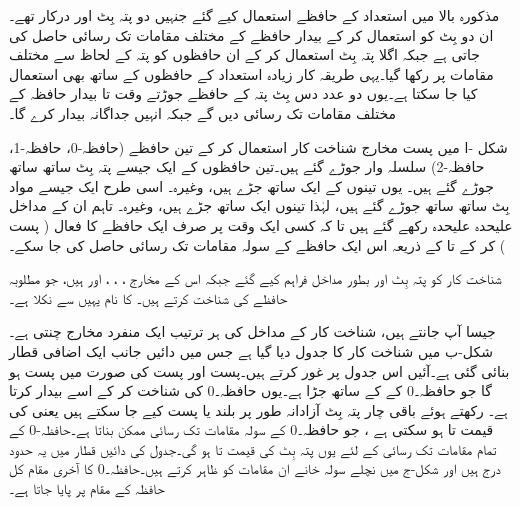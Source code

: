 مذکورہ بالا میں  استعداد کے حافظے استعمال کیے گئے جنہیں دو پتہ بِٹ  اور  درکار تھے۔ان دو بِٹ کو استعمال کر کے بیدار حافظے کے مختلف مقامات تک رسائی حاصل کی جاتی ہے جبکہ اگلا پتہ بِٹ  استعمال کر کے ان حافظوں کو پتہ کے لحاظ سے مختلف مقامات پر رکھا گیا۔یہی طریقہ کار زیادہ استعداد کے حافظوں کے ساتھ بھی استعمال کیا جا سکتا ہے۔یوں دو عدد دس بِٹ پتہ کے حافظے جوڑتے وقت  تا  بیدار حافظہ کے مختلف مقامات تک رسائی دیں گے جبکہ  انہیں جداگانہ بیدار کرے گا۔ 

شکل -ا میں پست مخارج شناخت کار استعمال کر کے تین  حافظے (حافظہ-0، حافظہ-1، حافظہ-2) سلسلہ وار جوڑے گئے ہیں۔تین حافظوں کے ایک جیسے پتہ بِٹ ساتھ ساتھ جوڑے گئے ہیں۔ یوں تینوں کے  ایک ساتھ جڑے ہیں، وغیرہ۔ اسی طرح ایک جیسے مواد بِٹ ساتھ ساتھ جوڑے گئے ہیں، لہٰذا تینوں  ایک ساتھ جڑے ہیں، وغیرہ۔ تاہم ان کے  مداخل علیحدہ علیحدہ رکھے گئے ہیں تا کہ کسی ایک وقت پر صرف ایک حافظے کا  فعال ( پست ) کر کے  تا  کے ذریعہ اس ایک حافظے کے سولہ مقامات تک رسائی حاصل کی جا سکے۔

 شناخت کار کو پتہ بِٹ  اور  بطور مداخل فراہم کیے گئے جبکہ اس کے مخارج ، ، ، اور  ہیں، جو مطلوبہ حافظے کی شناخت کرتے ہیں۔ کا نام یہیں سے نکلا ہے۔


جیسا آپ جانتے ہیں، شناخت کار کے مداخل کی ہر ترتیب ایک منفرد مخارج چنتی ہے۔شکل-ب میں شناخت کار کا جدول دیا گیا ہے جس میں دائیں جانب ایک اضافی قطار بنائی گئی ہے۔آئیں اس جدول پر غور کرتے ہیں۔پست  اور پست  کی صورت میں  پست ہو گا جو حافظہ۔0 کے  کے ساتھ جڑا ہے۔یوں حافظہ۔0 کی شناخت کر کے اسے بیدار کرتا ہے۔  رکھتے ہوئے باقی چار پتہ بِٹ آزادانہ طور پر بلند یا پست کیے جا سکتے ہیں یعنی  کی قیمت  تا  ہو سکتی ہے ، جو حافظہ۔0 کے سولہ مقامات تک رسائی ممکن بناتا ہے۔حافظہ-0 کے تمام مقامات تک رسائی کے لئے یوں پتہ بِٹ  کی قیمت  تا  ہو گی۔جدول کی دائیں قطار میں یہ حدود درج ہیں اور شکل-ج میں نچلے سولہ خانے ان مقامات کو ظاہر کرتے ہیں۔حافظہ۔0 کا آخری مقام کل حافظہ کے مقام  پر پایا جاتا ہے۔

